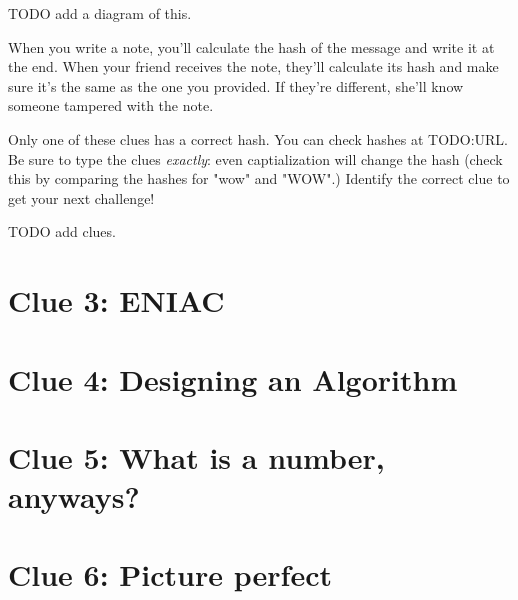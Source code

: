 \documentclass{article}
\begin{document}
TODO add a diagram of this.

When you write a note, you'll calculate the hash of the message and write it at the end. When your friend receives the note, they'll calculate its hash and make sure it's the same as the one you provided. If they're different, she'll know someone tampered with the note.

Only one of these clues has a correct hash. You can check hashes at TODO:URL. Be sure to type the clues \textit{exactly}: even captialization will change the hash (check this by comparing the hashes for "wow" and "WOW".) Identify the correct clue to get your next challenge!

TODO add clues.

\newpage

\section*{Clue 3: ENIAC}

\newpage

\section*{Clue 4: Designing an Algorithm}
\newpage

\section*{Clue 5: What is a number, anyways?}
\newpage

\section*{Clue 6: Picture perfect}
\end{document}
